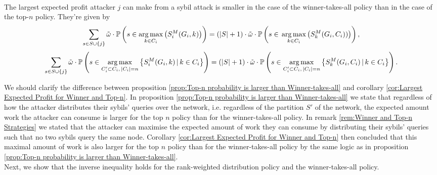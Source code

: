 \begin{corollary}[]\ \\
\label{cor:Largest Expected Profit for Winner and Top-n}
\noindent{}The largest expected profit attacker $j$ can make from a sybil attack is smaller in the case of the winner-takes-all policy than in the case of the top-$n$ policy. They're given by 
\[
\sum\limits_{s\in{}S\cup\lbrace{}j\rbrace}\tilde{\omega}\cdot{}\mathbb{P}\left(s\in\operatorname*{arg\,max}\limits_{k\in{}C_i}\left(S_i^M(G_i,k)\right)\right) = (|S|+1)\cdot\tilde{\omega}\cdot\mathbb{P}\left(s\in{}\operatorname*{arg\,max}\limits_{k\in{}C_i}\left(S_k^M(G_i,C_i))\right)\right),
\]
\noindent{}
\[
\sum\limits_{s\in{}S\cup\lbrace{}j\rbrace}\tilde{\omega}\cdot{}\mathbb{P}\left(s\in\argmax\limits_{C_i'\subset{}C_i,\,|C_i|=n}\left\lbrace{}S_i^M(G_i,k)\,|\,k\in{}C_i\right\rbrace\right) = (|S|+1)\cdot\tilde{\omega}\cdot\mathbb{P}\left(s\in\argmax\limits_{C_i'\subset{}C_i,\,|C_i|=n}\left\lbrace{}S_k^M(G_i,C_i)\,|\,k\in{}C_i\right\rbrace\right). \vspace{1em}\\
\]
\end{corollary}

\noindent{}We should clarify the difference between proposition \ref{prop:Top-n probability is larger than Winner-takes-all} and corollary \ref{cor:Largest Expected Profit for Winner and Top-n}. In proposition \ref{prop:Top-n probability is larger than Winner-takes-all} we state that regardless of how the attacker distributes their sybils' queries over the network, i.e. regardless of the partition $S'$ of the network, the expected amount work the attacker can consume is larger for the top $n$ policy than for the winner-takes-all policy. In remark \ref{rem:Winner and Top-n Strategies} we stated that the attacker can maximise the expected amount of work they can consume by distributing their sybils' queries such that no two sybils query the same node. Corollary \ref{cor:Largest Expected Profit for Winner and Top-n} then concluded that this maximal amount of work is also larger for the top $n$ policy than for the winner-takes-all policy by the same logic as in proposition \ref{prop:Top-n probability is larger than Winner-takes-all}. \vspace{1em}\\


\noindent{}Next, we show that the inverse inequality holds for the rank-weighted distribution policy and the winner-takes-all policy. \vspace{1em}\\

